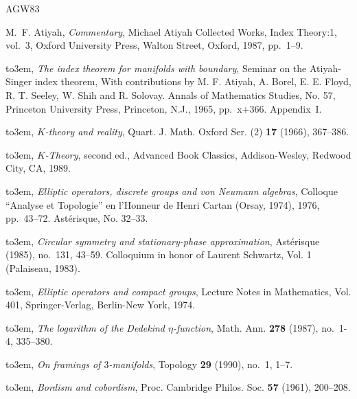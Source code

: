 \documentclass[11pt]{amsart}
\theoremstyle{definition}
\theoremstyle{remark}
\theoremstyle{plain}
\numberwithin{equation}{section}
\renewcommand{\:}{\colon}
\begin{document}
\clearpage
\renewcommand{\refname}{参考文献}
 \bigskip\bigskip
 
\providecommand{\bysame}{\leavevmode\hbox to3em{\hrulefill}\thinspace}
\providecommand{\MR}{\relax\ifhmode\unskip\space\fi MR }
\providecommand{\MRhref}[2]{%
  \href{http://www.ams.org/mathscinet-getitem?mr=#1}{#2}
}
\providecommand{\href}[2]{#2}
\begin{thebibliography}{AGW83}

M.~F. Atiyah, \emph{Commentary}, Michael Atiyah Collected Works, Index
  Theory:1, vol.~3, Oxford University Press, Walton Street, Oxford, 1987,
  pp.~1--9.

\bysame, \emph{The index theorem for manifolds with boundary}, Seminar on the
  {A}tiyah-{S}inger index theorem, With contributions by M. F. Atiyah, A.
  Borel, E. E. Floyd, R. T. Seeley, W. Shih and R. Solovay. Annals of
  Mathematics Studies, No. 57, Princeton University Press, Princeton, N.J.,
  1965, pp.~x+366. Appendix~I.

\bysame, \emph{{$K$}-theory and reality}, Quart. J. Math. Oxford Ser. (2)
  \textbf{17} (1966), 367--386.

\bysame, \emph{{$K$}-Theory}, second ed., Advanced Book Classics,
  Addison-Wesley, Redwood City, CA, 1989.

\bysame, \emph{Elliptic operators, discrete groups and von {N}eumann algebras},
  Colloque ``{A}nalyse et {T}opologie'' en l'{H}onneur de {H}enri {C}artan
  ({O}rsay, 1974), 1976, pp.~43--72. Ast\'{e}risque, No. 32--33.

\bysame, \emph{Circular symmetry and stationary-phase approximation},
  Ast{\'e}risque (1985), no.~131, 43--59. Colloquium in honor of Laurent
  Schwartz, Vol. 1 (Palaiseau, 1983).

\bysame, \emph{Elliptic operators and compact groups}, Lecture Notes in
  Mathematics, Vol. 401, Springer-Verlag, Berlin-New York, 1974.

\bysame, \emph{The logarithm of the {D}edekind {$\eta$}-function},
  \href{http://dx.doi.org/10.1007/BF01458075}{Math. Ann. \textbf{278} (1987)},
  no.~1-4, 335--380.

\bysame, \emph{On framings of {$3$}-manifolds}, Topology \textbf{29} (1990),
  no.~1, 1--7.

\bysame, \emph{Bordism and cobordism}, Proc. Cambridge Philos. Soc. \textbf{57}
  (1961), 200--208.


\end{thebibliography}
\end{document}
